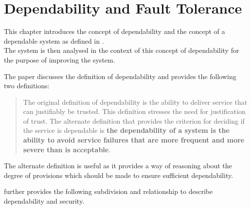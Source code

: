 \chapter{Dependability and Fault Tolerance}\label{ch:rts_depend}
This chapter introduces the concept of dependability and the concept of a dependable system as defined in \textcite{rts_depend}.\\
The system is then analysed in the context of this concept of dependability for the purpose of improving the system. 

The paper discusses the definition of dependability and provides the following two definitions:
\begin{quote}
  The original definition of dependability is the ability to
  deliver service that can justifiably be trusted. This definition
  stresses the need for justification of trust. The alternate
  definition that provides the criterion for deciding if the
  service is dependable is \textbf{the dependability of a system is the
  ability to avoid service failures that are more frequent and
  more severe than is acceptable}.
\end{quote}
  
The alternate definition is useful as it provides a way of reasoning about the degree of provisions which should be made to ensure sufficient dependability.

\textcite{rts_depend} further provides the following subdivision and relationship to describe dependability and security.

